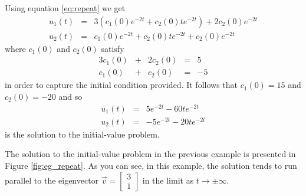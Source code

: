 \documentclass[../book.tex]{subfiles}
\begin{document}
\begin{solution}
Using equation \eqref{eq:repeat} we get
\begin{equation}\label{eq:sys-41}
\begin{array}{lcl}
  u_1(t) 
  &=& 
  3 (c_1(0)  e^{-2 t} + c_2(0) t e^{-2 t}) 
  +
  2 c_2(0) e^{-2 t}
  \\
  u_2(t)
  &=&
  c_1(0)  e^{-2 t} + c_2(0) t e^{-2 t} 
  +
  c_2(0) e^{-2 t}
\end{array}
\end{equation}
where \(c_1(0)\) and \(c_2(0)\) satisfy
\begin{equation}\label{eq:sys-42}
\begin{array}{rcrcl}
  3 c_1(0) &+& 2 c_2(0) &=& 5 \\
  c_1(0) &+& c_2(0) &=& -5
\end{array}
\end{equation}
in order to capture the initial condition provided. It follows that \(c_1(0) = 15\) and \(c_2(0) = -20\) and so
\begin{equation}\label{eq:sys-43}
\begin{array}{lcl}
  u_1(t) 
  &=& 
  5  e^{-2 t} - 60 t e^{-2 t}
  \\
  u_2(t)
  &=&
  -5 e^{-2 t} -20 t e^{-2 t} 
\end{array}
\end{equation}
is the solution to the initial-value problem.
\end{solution}
The solution to the initial-value problem in the previous example is presented in Figure \ref{fig:eg_repeat}. As you can see, in this example, the solution tends to run parallel to the eigenvector \(\vec{v} = \begin{bmatrix} 3 \\ 1 \end{bmatrix}\) in the limit as \(t\to \pm \infty\).
\end{document}
